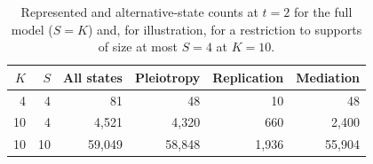 \begin{table}[htbp]
\centering
\caption{Represented and alternative-state counts at $t=2$ for the full model ($S=K$) and, for illustration, for a restriction to supports of size at most $S=4$ at $K=10$.}
\label{tab:counts}
\begin{tabular}{@{}rrrrrr@{}}
\toprule
$K$ & $S$ & All states & Pleiotropy & Replication & Mediation\\
\midrule
4 & 4 & 81 & 48 & 10 & 48\\
10 & 4 & 4,521 & 4,320 & 660 & 2,400\\
10 & 10 & 59,049 & 58,848 & 1,936 & 55,904\\
\bottomrule
\end{tabular}
\end{table}
